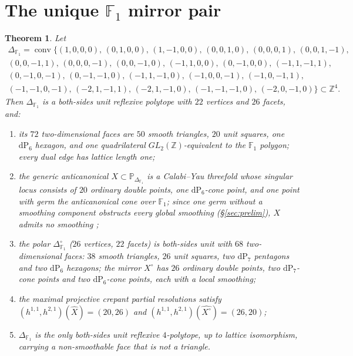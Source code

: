 \documentclass[11pt]{amsart}
\newtheorem{theorem}{Theorem}[section]
\theoremstyle{definition}
\theoremstyle{remark}
\newcommand{\ZZ}{\mathbb{Z}}
\newcommand{\PP}{\mathbb{P}}
\newcommand{\FF}{\mathbb{F}}
\newcommand{\conv}{\operatorname{conv}}
\begin{document}
\section{The unique \texorpdfstring{$\FF_1$}{F1} mirror pair}\label{sec:pair}

\begin{theorem}\label{thm:pairbody}
Let
\[
\begin{gathered}
\Delta_{\FF_1}=\conv\{(1,0,0,0),\,(0,1,0,0),\,(1,-1,0,0),\,(0,0,1,0),\,
(0,0,0,1),\,(0,0,1,-1),\\
(0,0,-1,1),\,(0,0,0,-1),\,(0,0,-1,0),\,(-1,1,0,0),\,(0,-1,0,0),\,
(-1,1,-1,1),\\
(0,-1,0,-1),\,(0,-1,-1,0),\,(-1,1,-1,0),\,(-1,0,0,-1),\,(-1,0,-1,1),\\
(-1,-1,0,-1),\,(-2,1,-1,1),\,(-2,1,-1,0),\,(-1,-1,-1,0),\,(-2,0,-1,0)\}
\subset \ZZ^4 .
\end{gathered}
\]
Then $\Delta_{\FF_1}$ is a both-sides unit reflexive polytope with $22$
vertices and $26$ facets, and:
\begin{enumerate}
\item its $72$ two-dimensional faces are $50$ smooth triangles, $20$ unit
squares, one $\mathrm{dP}_6$ hexagon, and one quadrilateral
$GL_2(\ZZ)$-equivalent to the $\FF_1$ polygon; every dual edge has lattice
length one;
\item the generic anticanonical $X \subset \PP_{\Delta_{\FF_1}}$ is a
Calabi--Yau threefold whose singular locus consists of $20$ ordinary double
points, one $\mathrm{dP}_6$-cone point, and one point with germ the
anticanonical cone over $\FF_1$; since one germ without a smoothing
component obstructs every global smoothing (\S\ref{sec:prelim}), $X$
admits no smoothing \cite[Cor.~4.3]{paper1};
\item the polar $\Delta_{\FF_1}^\circ$ ($26$ vertices, $22$ facets) is
both-sides unit with $68$ two-dimensional faces: $38$ smooth triangles, $26$ unit squares,
two $\mathrm{dP}_7$ pentagons and two $\mathrm{dP}_6$ hexagons; the mirror
$X^\circ$ has $26$ ordinary double points, two $\mathrm{dP}_7$-cone points
and two $\mathrm{dP}_6$-cone points, each with a local smoothing;
\item the maximal projective crepant partial resolutions satisfy
$(h^{1,1},h^{2,1})(\widehat X) = (20,26)$ and
$(h^{1,1},h^{2,1})(\widehat{X^\circ}) = (26,20)$;
\item $\Delta_{\FF_1}$ is the \emph{only}
both-sides unit reflexive
$4$-polytope, up to lattice isomorphism, carrying a
non-smoothable face that is not a triangle.
\end{enumerate}
\end{theorem}
\end{document}
